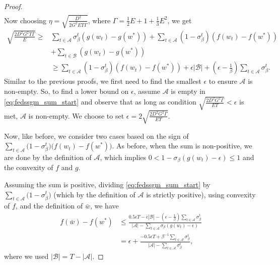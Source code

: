 \documentclass{article} %
\def\A{{\mathcal A}}
\def\B{{\mathcal B}}
\begin{document}
\begin{proof}
\begin{equation*}
\begin{aligned}
    \end{aligned}
\end{equation*}
Now choosing $\eta = \sqrt{\frac{D^2}{2G^2 E T \Gamma}}$, where $\Gamma = \frac{1}{2} E + 1 + \frac{1}{3} E^2$, we get
\begin{equation}
    \label{eq:fedssgm_sum_start}
    \begin{aligned}
      \sqrt{\frac{{2 D^2 G^2 T \Gamma}}{{E}}} \geq &\sum_{t\in \A} \sigma_\beta^t \left(g(w_t) - g(w^*) \right) 
       + \sum_{t\in \A} (1 - \sigma_{\beta}^t)\left(f(w_t) - f(w^*)  \right) 
       \\
       &+\sum_{t\in \B} \left(g(w_t) - g(w^*) \right)
       \\
       &\geq \sum_{t\in \A} (1 - \sigma_{\beta}^t)\left(f(w_t) - f(w^*)  \right) + \epsilon|\B| + \left(\epsilon - \frac{1}{\beta}\right)\sum_{t\in \A} \sigma_\beta^t.
    \end{aligned}
\end{equation}
Similar to the previous proofs, we first need to find the smallest $\epsilon$ to ensure $\A$ is non-empty. So, to find a lower bound on $\epsilon$, assume $\A$ is empty in \cref{eq:fedssgm_sum_start} and observe that as long as condition $\sqrt{\frac{{2 D^2 G^2\Gamma}}{{E T}}} < \epsilon$ is met, $\A$ is non-empty. We choose to set $\epsilon = 2\sqrt{\frac{{2 D^2 G^2\Gamma}}{{E T}}}$.

Now, like before, we consider two cases based on the sign of $\sum_{t\in \A} \big(1-\sigma_\beta^t\big) \big(f(w_t)-f(w^*)\big)$. As before, when the sum is non-positive, we are done by the definition of $\A$, which implies $0<1-\sigma_\beta(g(w_t)-\epsilon)\leq 1$ and the convexity of $f$ and $g$. 

Assuming the sum is positive, dividing  \cref{eq:fedssgm_sum_start} by $\sum_{t\in \A} \big(1-\sigma_\beta^t\big)$ (which by the definition of $\A$ is strictly positive), using convexity of $f$, and the definition of $\bar{w}$, we have
\begin{equation*}
\begin{aligned}
       f(\bar{w})-f(w^*) &\leq  \frac{0.5\epsilon T - \epsilon |\B|-(\epsilon-\frac{1}{\beta})\sum_{t\in \A} \sigma_\beta^t}{|\A| - \sum_{t\in \A} \sigma_\beta(g(w_t)-\epsilon)}\\&=\epsilon+\frac{-0.5\epsilon T+\beta^{-1}\sum_{t\in \A} \sigma_\beta^t}{|\A| - \sum_{t\in \A} \sigma_\beta^t},
\end{aligned}
\end{equation*}
where we used $|\B| = T-|\A|$.


\end{proof}
\end{document}

